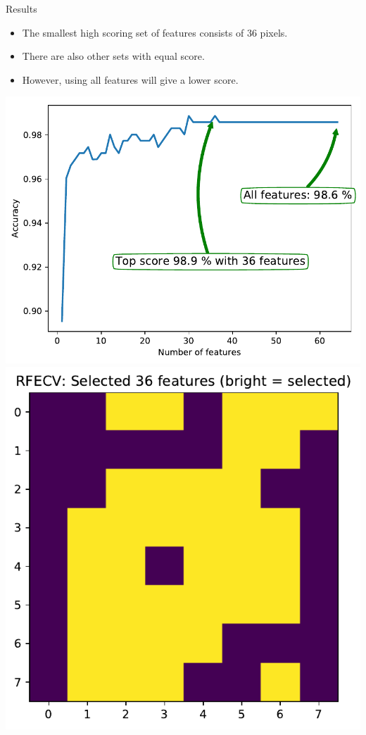 \documentclass[10pt, aspectratio=169]{beamer} %
\begin{document}
\begin{frame}{Results}
\begin{itemize}
\item The smallest high scoring set of features consists of 36 pixels.
\item There are also other sets with equal score.
\item However, using all features will give a lower score.
\end{itemize}
\begin{center}
	\includegraphics[height=0.4\textheight]{rfe_accuracy.pdf}
\qquad
\includegraphics[height=0.4\textheight]{rfe_mask.pdf}
\end{center}
\end{frame}
\end{document}
